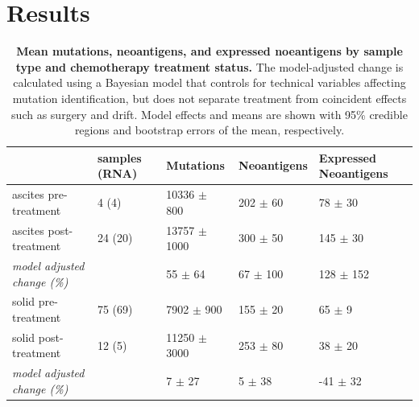 \section*{Results}

\begin{table}[htbp]


\begin{tabular}{lllll}
\toprule
{} & samples (RNA) &         Mutations &   Neoantigens & Expressed Neoantigens \\
\midrule
ascites pre-treatment                 &         4 (4) &   10336 $\pm$ 800 &  202 $\pm$ 60 &           78 $\pm$ 30 \\
ascites post-treatment                &       24 (20) &  13757 $\pm$ 1000 &  300 $\pm$ 50 &          145 $\pm$ 30 \\
\textit{model adjusted change (\%)} &               &       55 $\pm$ 64 &  67 $\pm$ 100 &         128 $\pm$ 152 \\
\hline
solid pre-treatment                   &       75 (69) &    7902 $\pm$ 900 &  155 $\pm$ 20 &            65 $\pm$ 9 \\
solid post-treatment                  &        12 (5) &  11250 $\pm$ 3000 &  253 $\pm$ 80 &           38 $\pm$ 20 \\
\textit{model adjusted change (\%)}   &               &        7 $\pm$ 27 &    5 $\pm$ 38 &          -41 $\pm$ 32 \\
\bottomrule
\end{tabular}



\caption{\textbf{Mean mutations, neoantigens, and expressed noeantigens by sample type and chemotherapy treatment status.} The model-adjusted change is calculated using a Bayesian model that controls for technical variables affecting mutation identification, but does not separate treatment from coincident effects such as surgery and drift. Model effects and means are shown with 95\% credible regions and bootstrap errors of the mean, respectively.}
\label{tab:cohort}
\end{table}

